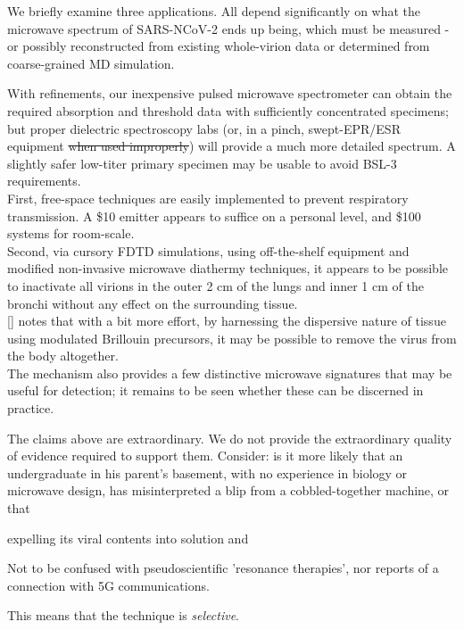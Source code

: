 \documentclass[paper.tex]{subfiles}
\begin{document}
\begin{multicols}{1}
We briefly examine three applications. All depend significantly on what the microwave spectrum of SARS-NCoV-2 ends up being, which must be measured - or possibly reconstructed from existing whole-virion data or determined from coarse-grained MD simulation. 

With refinements, our inexpensive pulsed microwave spectrometer can obtain the required absorption and threshold data with sufficiently concentrated specimens; but proper dielectric spectroscopy labs (or, in a pinch, swept-EPR/ESR equipment \st{when used improperly}) will provide a much more detailed spectrum. A slightly safer low-titer primary specimen may be usable to avoid BSL-3 requirements. \\



First, free-space techniques are easily implemented to prevent respiratory transmission. A \$10 emitter appears to suffice on a personal level, and \$100 systems for room-scale.\\

%
Second, via cursory FDTD simulations, using off-the-shelf equipment and modified non-invasive microwave diathermy techniques, it appears to be possible to inactivate all virions in the outer 2 cm of the lungs and inner 1 cm of the bronchi without any effect on the surrounding tissue. 
\\

[] notes that with a bit more effort, by harnessing the dispersive nature of tissue using modulated Brillouin precursors, it may be possible to remove the virus from the body altogether.\\

The mechanism also provides a few distinctive microwave signatures that may be useful for detection; it remains to be seen whether these can be discerned in practice.

The claims above are extraordinary. We do not provide the extraordinary quality of evidence required to support them. Consider: is it more likely that an undergraduate in his parent's basement, with no experience in biology or microwave design, has misinterpreted a blip from a cobbled-together machine, or that 

expelling its viral contents into solution and 

Not to be confused with pseudoscientific 'resonance therapies', nor reports of a connection with 5G communications.

This means that the technique is {\it selective}.




\end{multicols}
\end{document}
